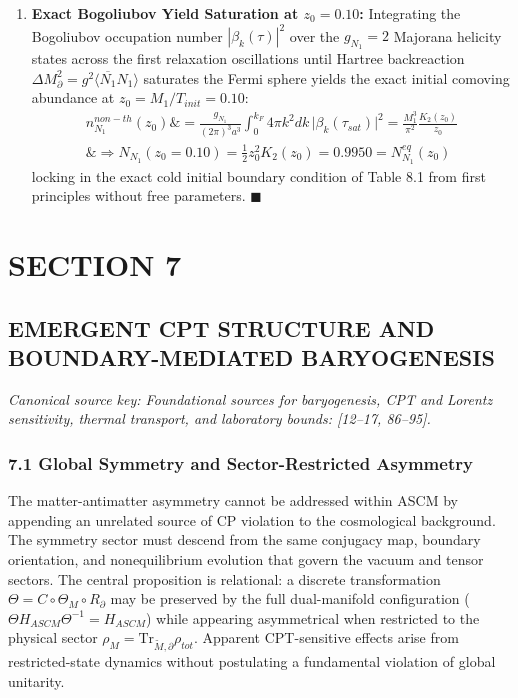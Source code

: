 \documentclass[aps,prd,onecolumn,superscriptaddress,nofootinbib,longbibliography,10pt]{revtex4-2}
\begin{document}
\begin{enumerate}
\item \textbf{Exact Bogoliubov Yield Saturation at \(z_0 = 0.10\):} Integrating the Bogoliubov occupation number \(|\beta_k(\tau)|^2\) over the \(g_{N_1} = 2\) Majorana helicity states across the first relaxation oscillations until Hartree backreaction \(\Delta M_{\partial}^2 = g^2\langle\overline{N_1}N_1\rangle\) saturates the Fermi sphere yields the exact initial comoving abundance at \(z_0 = M_1/T_{init} = 0.10\):
  \[\begin{aligned} n_{N_1}^{non-th}(z_0) \&= \frac{g_{N_1}}{(2\pi)^3 a^3}\int_0^{k_F} 4\pi k^2 dk \,\vert\beta_k(\tau_{sat})\vert^2 = \frac{M_1^3}{\pi^2} \frac{K_2(z_0)}{z_0} \\ \&\Rightarrow N_{N_1}(z_0=0.10) = \frac{1}{2}z_0^2 K_2(z_0) = 0.9950 = N_{N_1}^{eq}(z_0) \end{aligned}\]
  locking in the exact cold initial boundary condition of Table 8.1 from first principles without free parameters. \(\blacksquare\)

\end{enumerate}




\section*{SECTION 7}

  
\subsection*{EMERGENT CPT STRUCTURE AND BOUNDARY-MEDIATED BARYOGENESIS}

  \textit{Canonical source key: Foundational sources for baryogenesis, CPT and Lorentz sensitivity, thermal transport, and laboratory bounds: [12–17, 86–95].}


  
\subsubsection*{7.1 Global Symmetry and Sector-Restricted Asymmetry}

The matter-antimatter asymmetry cannot be addressed within ASCM by appending an unrelated source of CP violation to the cosmological background. The symmetry sector must descend from the same conjugacy map, boundary orientation, and nonequilibrium evolution that govern the vacuum and tensor sectors. The central proposition is relational: a discrete transformation \(\Theta = C \circ \Theta_M \circ R_\partial\) may be preserved by the full dual-manifold configuration (\(\Theta H_{ASCM}\Theta^{-1} = H_{ASCM}\)) while appearing asymmetrical when restricted to the physical sector \(\rho_M = \mathrm{Tr}_{\tilde{M},\partial}\rho_{tot}\). Apparent CPT-sensitive effects arise from restricted-state dynamics without postulating a fundamental violation of global unitarity.
\end{document}
